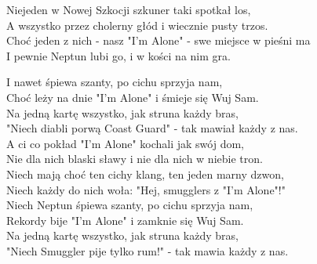 Niejeden w Nowej Szkocji szkuner taki spotkał los, \\
A wszystko przez cholerny głód i wiecznie pusty trzos. \\
Choć jeden z nich - nasz "I'm Alone" - swe miejsce w pieśni ma \\
I pewnie Neptun lubi go, i w kości na nim gra. \\
\newpage

I nawet śpiewa szanty, po cichu sprzyja nam, \\
Choć leży na dnie "I'm Alone" i śmieje się Wuj Sam. \\
Na jedną kartę wszystko, jak struna każdy bras, \\
"Niech diabli porwą Coast Guard" - tak mawiał każdy z nas. \\

A ci co pokład "I'm Alone" kochali jak swój dom, \\
Nie dla nich blaski sławy i nie dla nich w niebie tron. \\
Niech mają choć ten cichy klang, ten jeden marny dzwon, \\
Niech każdy do nich woła: "Hej, smugglers z "I'm Alone"!" \\

Niech Neptun śpiewa szanty, po cichu sprzyja nam, \\
Rekordy bije "I'm Alone" i zamknie się Wuj Sam. \\
Na jedną kartę wszystko, jak struna każdy bras, \\
"Niech Smuggler pije tylko rum!" - tak mawia każdy z nas. \\